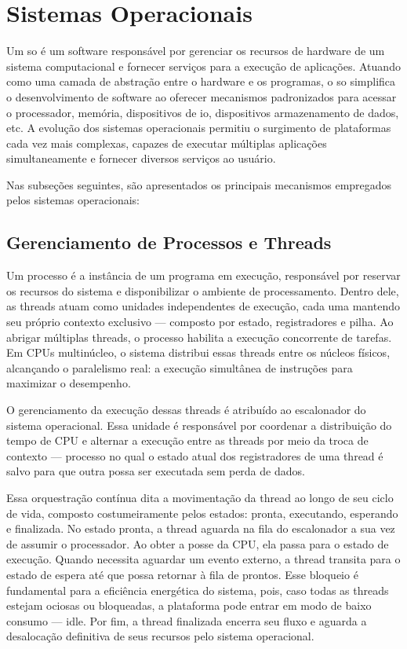 \section{Sistemas Operacionais}

Um \gls{so} é um software responsável por gerenciar os recursos de hardware de um sistema computacional e fornecer serviços para a execução de aplicações.
Atuando como uma camada de abstração entre o hardware e os programas, o \gls{so} simplifica o desenvolvimento de software ao oferecer mecanismos padronizados
para acessar o processador, memória, dispositivos de \gls{io}, dispositivos armazenamento de dados, etc. A evolução dos sistemas operacionais permitiu o
surgimento de plataformas cada vez mais complexas, capazes de executar múltiplas aplicações simultaneamente e fornecer diversos serviços ao usuário.

Nas subseções seguintes, são apresentados os principais mecanismos empregados pelos sistemas operacionais:

\subsection{Gerenciamento de Processos e Threads}

Um processo é a instância de um programa em execução, responsável por reservar os recursos do sistema e disponibilizar o ambiente de processamento.
Dentro dele, as threads atuam como unidades independentes de execução, cada uma mantendo seu próprio contexto exclusivo — composto por estado, registradores e pilha.
Ao abrigar múltiplas threads, o processo habilita a execução concorrente de tarefas. Em CPUs multinúcleo, o sistema distribui essas threads entre os núcleos físicos,
alcançando o paralelismo real: a execução simultânea de instruções para maximizar o desempenho.

O gerenciamento da execução dessas threads é atribuído ao escalonador do sistema operacional. Essa unidade é responsável por coordenar a distribuição do tempo de CPU
e alternar a execução entre as threads por meio da troca de contexto — processo no qual o estado atual dos registradores de uma thread é salvo para que outra possa ser
executada sem perda de dados.

Essa orquestração contínua dita a movimentação da thread ao longo de seu ciclo de vida, composto costumeiramente pelos estados: pronta, executando, esperando e finalizada.
No estado pronta, a thread aguarda na fila do escalonador a sua vez de assumir o processador. Ao obter a posse da CPU, ela passa para o estado de execução.
Quando necessita aguardar um evento externo, a thread transita para o estado de espera até que possa retornar à fila de prontos. Esse bloqueio é fundamental para
a eficiência energética do sistema, pois, caso todas as threads estejam ociosas ou bloqueadas, a plataforma pode entrar em modo de baixo consumo --- idle.
Por fim, a thread finalizada encerra seu fluxo e aguarda a desalocação definitiva de seus recursos pelo sistema operacional.

